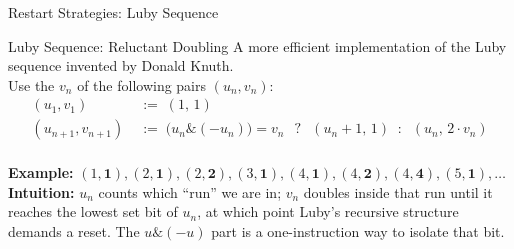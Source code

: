 \documentclass[t]{sdqbeamer}
\begin{document}
\begin{frame}{Restart Strategies: Luby Sequence}
\begin{blueblock}{Luby Sequence: Reluctant Doubling}
A more efficient implementation of the Luby sequence invented by Donald Knuth.\\[1ex]
Use the $v_n$ of the following pairs $(u_n, v_n)$:
\begin{align*}
(u_1, v_1) &\;:=\; (1,\, 1) \\[0.4ex]
(u_{n+1}, v_{n+1}) &\;:=\;
\bigl(u_n \mathbin{\&} (-u_n)\bigr) = v_n
\;\;\mathrel{?}\;\; (u_n{+}1,\, 1)
\;\;\mathrel{:}\;\; (u_n,\, 2 \cdot v_n)
\end{align*}~\\[1ex]
\textbf{Example: }$(1,\mathbf{1}), (2,\mathbf{1}), (2,\mathbf{2}), (3,\mathbf{1}), (4,\mathbf{1}), (4,\mathbf{2}), (4,\mathbf{4}), (5,\mathbf{1}), \ldots$\\[1em]
\textbf{Intuition: }$u_n$ counts which ``run'' we are in; $v_n$ doubles inside that run until it reaches the lowest set bit of $u_n$, at which point Luby's recursive structure demands a reset.
The $u \mathbin{\&} (-u)$ part is a one-instruction way to isolate that bit.
\end{blueblock}
\end{frame}
\end{document}
